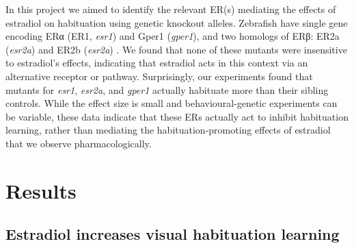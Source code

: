 \documentclass[9pt,lineno]{RandlettLab_elife}
\begin{document}
In this project we aimed to identify the relevant ER(s) mediating the effects of estradiol on habituation using genetic knockout alleles.
Zebrafish have single gene encoding ERα (ER1, \emph{esr1}) and Gper1 (\emph{gper1}), and two homologs of ERβ: ER2a (\emph{esr2a}) and ER2b (\emph{esr2a})  \citep{Romano2017-ep, Menuet2002-fo}.  
We found that none of these mutants were insensitive to estradiol's effects, indicating that estradiol acts in this context via an alternative receptor or pathway. 
Surprisingly, our experiments found that mutants for \emph{esr1}, \emph{esr2a}, and \emph{gper1} actually habituate more than their sibling controls. 
While the effect size is small and behavioural-genetic experiments can be variable, these data indicate that these ERs actually act to inhibit habituation learning, rather than mediating the habituation-promoting effects of estradiol that we observe pharmacologically. 


\section{Results}

\subsection{Estradiol increases visual habituation learning}
\end{document}
